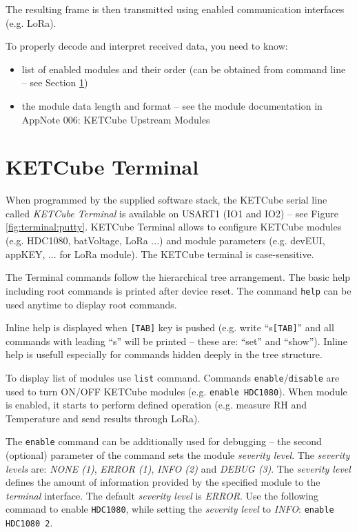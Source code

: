The resulting frame is then transmitted using enabled communication interfaces (e.g. LoRa). 

To properly decode and interpret received data, you need to know:
\begin{itemize}
  \item list of enabled modules and their order (can be obtained from command line -- see Section \ref{sec:terminal})
  \item the module data length and format -- see the module documentation in AppNote 006: KETCube Upstream Modules \cite{ZCU:KETCubeAppNote006:09-2019}
\end{itemize}


\clearpage
\section{KETCube Terminal}\label{sec:terminal}
When programmed by the supplied software stack, the KETCube serial line called {\it KETCube Terminal} is available on USART1 (IO1 and IO2) -- see Figure \ref{fig:terminal:putty}. KETCube Terminal allows to configure KETCube modules (e.g. HDC1080, batVoltage, LoRa ...) and module parameters (e.g. devEUI, appKEY, ... for LoRa module). The KETCube terminal is case-sensitive.

The Terminal commands follow the hierarchical tree arrangement. The basic help including root commands is printed after device reset. The command {\tt help} can be used anytime to display root commands.

Inline help is displayed when {\tt [TAB]} key is pushed (e.g. write “s{\tt [TAB]}” and all commands with leading “s” will be printed -- these are: “set” and “show”). Inline help is usefull especially for commands hidden deeply in the tree structure.

To display list of modules use {\tt list} command. Commands {\tt enable}/{\tt disable} are used to turn ON/OFF KETCube modules (e.g. {\tt enable HDC1080}). When module is enabled, it starts to perform defined operation (e.g. measure RH and Temperature and send results through LoRa). 

The {\tt enable} command can be additionally used for debugging -- the second (optional) parameter of the command sets the module {\it severity level}. The {\it severity levels} are: {\it NONE (1)}, {\it ERROR (1)}, {\it INFO (2)} and {\it DEBUG (3)}. The {\it severity level} defines the amount of information provided by the specified module to the {\it terminal} interface. The default  {\it severity level} is {\it ERROR}. Use the following command to enable {\tt HDC1080}, while setting the {\it severity level} to {\it INFO}: {\tt enable HDC1080 2}.

